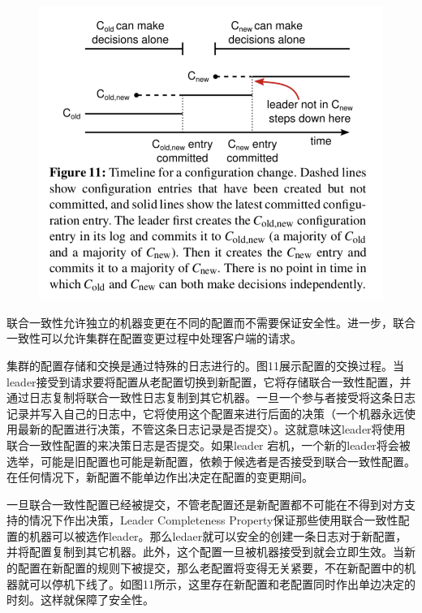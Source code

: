 \documentclass[journal]{IEEEtran}
\begin{document}
\begin{figure}[htbp]
\begin{center}
\includegraphics[width=1\linewidth]{./fig11.png}
\end{center}
\end{figure}
联合一致性允许独立的机器变更在不同的配置而不需要保证安全性。进一步，联合一致性可以允许集群在配置变更过程中处理客户端的请求。

集群的配置存储和交换是通过特殊的日志进行的。图11展示配置的交换过程。当leader接受到请求要将配置从老配置切换到新配置，它将存储联合一致性配置，并通过日志复制将联合一致性日志复制到其它机器。一旦一个参与者接受将这条日志记录并写入自己的日志中，它将使用这个配置来进行后面的决策（一个机器永远使用最新的配置进行决策，不管这条日志记录是否提交）。这就意味这leader将使用联合一致性配置的来决策日志是否提交。如果leader 宕机，一个新的leader将会被选举，可能是旧配置也可能是新配置，依赖于候选者是否接受到联合一致性配置。在任何情况下，新配置不能单边作出决定在配置的变更期间。

一旦联合一致性配置已经被提交，不管老配置还是新配置都不可能在不得到对方支持的情况下作出决策，Leader Completeness Property保证那些使用联合一致性配置的机器可以被选作leader。那么ledaer就可以安全的创建一条日志对于新配置，并将配置复制到其它机器。此外，这个配置一旦被机器接受到就会立即生效。当新的配置在新配置的规则下被提交，那么老配置将变得无关紧要，不在新配置中的机器就可以停机下线了。如图11所示，这里存在新配置和老配置同时作出单边决定的时刻。这样就保障了安全性。
\end{document}
